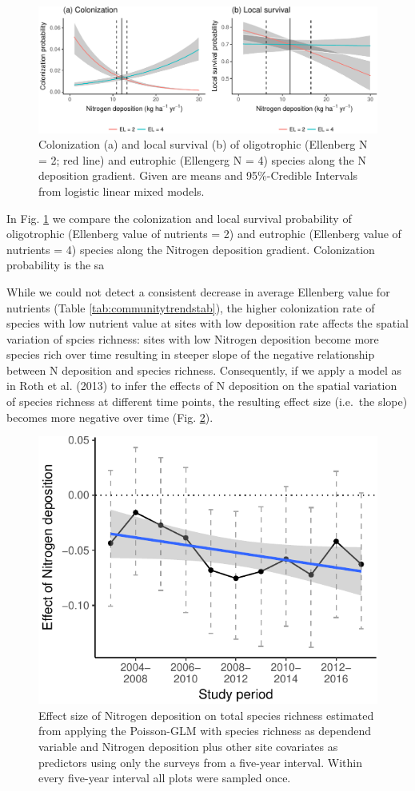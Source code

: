\documentclass[fleqn,10pt,lineno]{wlpeerj} %
\theoremstyle{definition}
\theoremstyle{definition}
\theoremstyle{definition}
\theoremstyle{remark}
\begin{document}
\begin{figure}
\includegraphics[width=1\linewidth]{Manuscript_files/figure-latex/cl-1} \caption{Colonization (a) and local survival (b) of oligotrophic (Ellenberg N = 2; red line) and eutrophic (Ellengerg N = 4) species along the N deposition gradient. Given are means and 95\%-Credible Intervals from logistic linear mixed models.}\label{fig:cl}
\end{figure}

In Fig. \ref{fig:cl} we compare the colonization and local survival
probability of oligotrophic (Ellenberg value of nutrients = 2) and
eutrophic (Ellenberg value of nutrients = 4) species along the Nitrogen
deposition gradient. Colonization probability is the sa

While we could not detect a consistent decrease in average Ellenberg
value for nutrients (Table \ref{tab:communitytrendstab}), the higher
colonization rate of species with low nutrient value at sites with low
deposition rate affects the spatial variation of spcies richness: sites
with low Nitrogen deposition become more species rich over time
resulting in steeper slope of the negative relationship between N
deposition and species richness. Consequently, if we apply a model as in
Roth et al. (2013) to infer the effects of N deposition on the spatial
variation of species richness at different time points, the resulting
effect size (i.e.~the slope) becomes more negative over time (Fig.
\ref{fig:figconsequences}).

\begin{figure}
\includegraphics[width=0.5\linewidth]{Manuscript_files/figure-latex/figconsequences-1} \caption{Effect size of Nitrogen deposition on total species richness estimated from applying the Poisson-GLM with species richness as dependend variable and Nitrogen deposition plus other site covariates as predictors using only the surveys from a five-year interval. Within every five-year interval all plots were sampled once.}\label{fig:figconsequences}
\end{figure}
\end{document}
